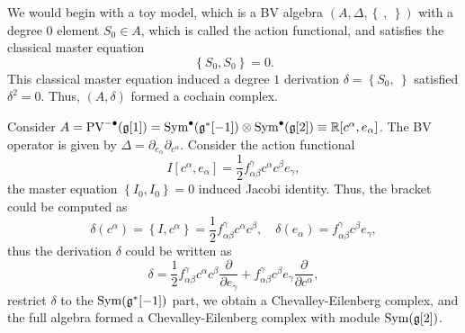 \documentclass[10pt]{article}
\begin{document}
We would begin with a toy model, which is a BV algebra $\left( A, \Delta, \left\{ ~,~ \right\} \right)$ with a degree $ 0 $ element $ S_0 \in A$, which is called the action functional, and satisfies the classical master equation
\begin{equation*}
  \left\{ S_0, S_0 \right\} = 0.
\end{equation*}
This classical master equation induced a degree $ 1$ derivation $ \delta = \left\{ S_0, ~ \right\}$ satisfied $ \delta^{2} = 0$.
Thus, $\left( A, \delta \right)$ formed a cochain complex.
\begin{example}
  Consider $ A = \mathrm{PV}^{-\bullet}(\mathfrak{g}[1]) = \operatorname{Sym}^{\bullet}(\mathfrak{g}^{*}[-1]) \otimes \operatorname{Sym}^{\bullet}(\mathfrak{g}[2]) \equiv \mathbb{R}[c^{\alpha}, e_{\alpha}]$.
  The BV operator is given by $ \Delta = \partial_{e_{\alpha}} \partial_{c^{\alpha}}$.
  Consider the action functional
  \begin{equation*}
    I[c^{\alpha}, e_{\alpha}] = \frac{1}{2} f_{\alpha \beta}^{\gamma} c^{\alpha} c^{\beta} e_{\gamma},
  \end{equation*}
  the master equation $\left\{ I_0, I_0 \right\} = 0$ induced Jacobi identity. Thus, the bracket could be computed as
  \begin{equation*}
    \delta(c^{\alpha}) = \left\{ I, c^{\alpha} \right\} = \frac{1}{2} f_{\alpha \beta}^{\gamma} c^{\alpha} c^{\beta}, \quad \delta(e_{\alpha}) = f_{\alpha \beta}^{\gamma} c^{\beta} e_{\gamma},
  \end{equation*}
  thus the derivation $\delta$ could be written as
  \begin{equation*}
    \delta = \frac{1}{2} f_{\alpha \beta}^{\gamma} c^{\alpha} c^{\beta} \frac{\partial }{\partial e_{\gamma}} + f_{\alpha \beta}^{\gamma} c^{\beta} e_{\gamma} \frac{\partial }{\partial c^{\alpha}},
  \end{equation*}
  restrict $ \delta$ to the $\operatorname{Sym}(\mathfrak{g}^{*}[-1])$ part, we obtain a Chevalley-Eilenberg complex, and the full algebra formed a Chevalley-Eilenberg complex with module $\operatorname{Sym}(\mathfrak{g}[2])$.
\end{example}
\end{document}
